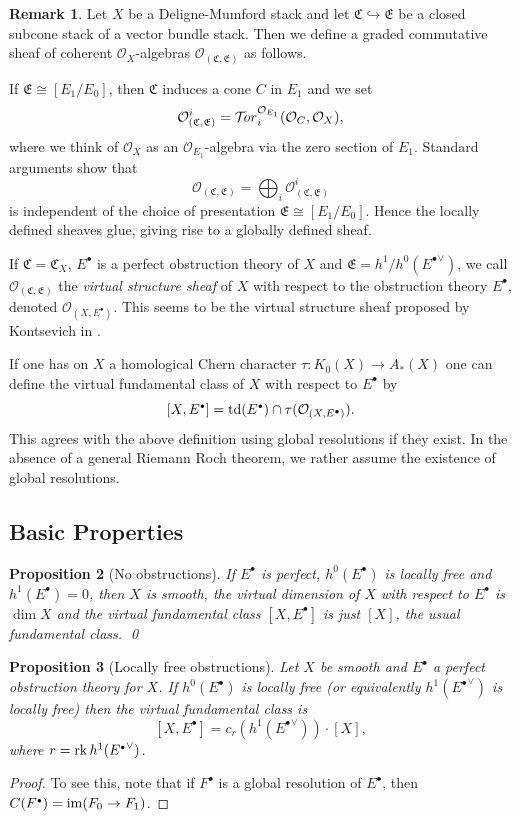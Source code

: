 \documentclass[11pt]{article}
\theoremstyle{plain}
\newtheorem{prop}{Proposition}[section]
\theoremstyle{definition}
\newtheorem{numrmkp}[prop]{Remark}
\newenvironment{numrmk}{\begin{numrmkp}\normalfont}{\end{numrmkp}}
\newenvironment{pf}{\begin{proof}}{\end{proof}}
\newcommand{\dual}[1]{{{#1}^{\vee}}}
\newcommand{\lst}{_{\ast}}
\newcommand{\com}{^{\scriptscriptstyle\bullet}}
\newcommand{\EE}{{\mathfrak{E}}}
\newcommand{\CC}{{\mathfrak{C}}}
\newcommand{\tT}{{\mathcal{T}}}
\renewcommand{\O}{{\mathcal{O}}}
\newcommand{\rk}{\mathop{\rm rk}}
\newcommand{\td}{\mathop{\rm td}}
\newcommand{\im}{\mathop{\rm im}}
\newcommand{\sheaftor}{\mathop{\rm {\mit{ \tT\! or}}}\nolimits}
\theoremstyle{plain}
\theoremstyle{definition}
\theoremstyle{remark}
\begin{document}
\begin{numrmk}[Virtual Structure Sheaves] \label{vss}
Let \(X\) be a Deligne-Mumford stack and let \(\CC\hookrightarrow\EE\) be
a closed subcone stack of a vector bundle stack. Then we define a
graded commutative sheaf of coherent \(\O_X\)-algebras \(\O_{(\CC,\EE)}\)
as follows.

If \(\EE\cong[E_1/E_0]\), then \(\CC\) induces a cone \(C\) in \(E_1\) and we
set
\[
\O_{(\CC,\EE)}^i=\sheaftor_i^{\O_{E_1}}(\O_C,\O_X),
\]
where we think of \(\O_X\) as an \(\O_{E_1}\)-algebra via the zero section
of \(E_1\). Standard arguments show that
\[
\O_{(\CC,\EE)}=\bigoplus_i \O_{(\CC,\EE)}^i
\]
is independent of the choice of presentation \(\EE\cong[E_1/E_0]\).
Hence the locally defined sheaves glue, giving rise to a globally
defined sheaf.

If \(\CC=\CC_X\), \(E\com\) is a perfect obstruction theory of \(X\) and
\(\EE=h^1/h^0(\dual{E\com})\), we call \(\O_{(\CC,\EE)}\) the {\em virtual
structure sheaf }of \(X\) with respect to the obstruction theory
\(E\com\), denoted \(\O_{(X,E\com)}\). This seems to be the virtual
structure sheaf proposed by Kontsevich in
\cite{K}.

If one has on \(X\) a homological Chern character
\(\tau:K_0(X)\rightarrow A\lst(X)\) one can define the virtual
fundamental class of \(X\) with respect to \(E\com\) by
\[
[X,E\com]=\td(E\com)\cap\tau(\O_{(X,E\com)}).
\]
This agrees with the above definition using global resolutions if they
exist. In the absence of a general Riemann Roch theorem, we rather
assume the existence of global resolutions.
\end{numrmk}

\subsection{Basic Properties}

\begin{prop}[No obstructions] \label{ehs} If \(E\com\) is
perfect, \(h^0(E\com)\) is locally free and \(h^1({E\com})=0\), then
\(X\) is smooth, the virtual dimension of \(X\) with respect to \(E\com\) is \(\dim X\)
and
the virtual fundamental class \([X,E\com]\) is just \([X]\), the usual
fundamental class. \qed
\end{prop}

\begin{prop}[Locally free obstructions] \label{xself} Let \(X\) be
smooth and \(E\com\) a perfect
obstruction theory for \(X\). If \(h^0(E\com)\) is locally free (or
equivalently \(h^1(\dual{E\com})\) is locally free) then the virtual
fundamental class is
\[
[X,E\com]=c_r(h^1(\dual{E\com}))\cdot[X],
\]
where \(r=\rk h^1(\dual{E\com})\).
\end{prop}
\begin{pf}
To see this, note that if \(F\com\) is a global resolution of \(E\com\),
then \(C(F\com)=\im(F_0\rightarrow F_1)\).
\end{pf}
\end{document}
